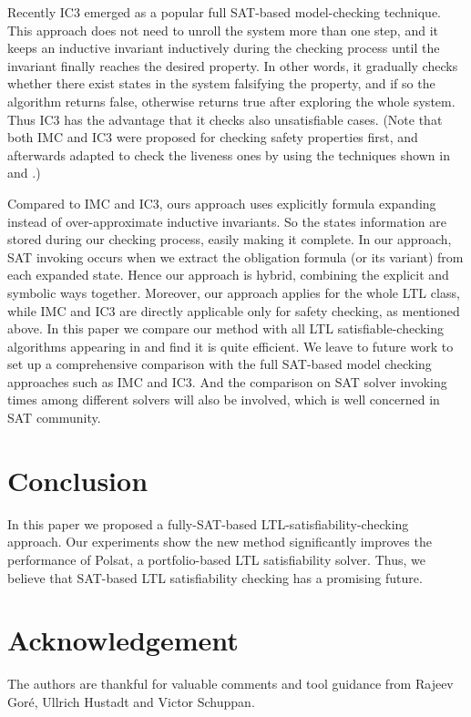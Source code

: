 \documentclass[conference]{IEEEtran}
\begin{document}
Recently IC3 \cite{Bra11} emerged as a popular full SAT-based model-checking technique. 
This approach does not need to unroll the system more than one step, and it keeps an 
inductive invariant inductively during the checking process until the invariant finally 
reaches the desired property. In other words, it gradually checks whether there exist states 
in the system falsifying the property, and if so the algorithm returns false, otherwise 
returns true after exploring the whole system. Thus IC3 has the advantage that it checks also 
unsatisfiable cases.  (Note that both IMC and IC3 were proposed for checking safety properties 
first, and afterwards adapted to check the liveness ones by using the techniques shown in \cite{BAS02} and \cite{BSHZ11}.)

Compared to IMC and IC3, ours approach uses explicitly formula expanding instead of over-approximate 
inductive invariants. So the states information are stored during our checking process, easily making
it complete. In our approach, SAT invoking occurs when we extract the obligation formula (or its variant) 
from each expanded state. Hence our approach is hybrid, combining the explicit and symbolic ways together. 
Moreover, our approach applies for the whole LTL class, while IMC and IC3 are directly applicable
only for safety checking, as mentioned above. In this paper we compare our method with all LTL 
satisfiable-checking algorithms appearing in \cite{SD11} and find it is quite efficient. We leave to
future work to set up a comprehensive comparison with the full SAT-based model checking approaches 
such as IMC and IC3. And the comparison on SAT solver invoking times among different solvers will 
also be involved, which is well concerned in SAT community.

 

\section{Conclusion}\label{sec:con}

In this paper we proposed a fully-SAT-based LTL-satisfiability-checking approach. Our experiments show the new method significantly improves
the performance of Polsat, a portfolio-based LTL satisfiability solver. Thus, we believe that SAT-based LTL satisfiability checking has a promising future.

\section{Acknowledgement}
The authors are thankful for valuable comments and tool guidance from Rajeev Gor\'e, Ullrich Hustadt and Victor Schuppan. 



\end{document}
